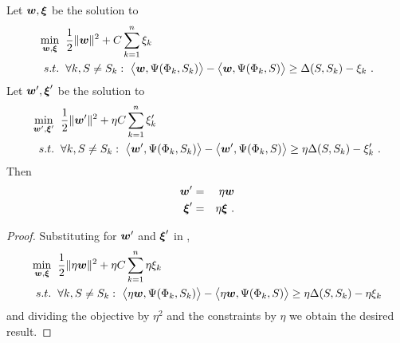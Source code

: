 \begin{proposition}
\label{prop:equivalence}
  Let $\Model,\Slacks$ be the solution to
  \begin{equation}
    \begin{split}
      \min_{\Model,\Slacks} &
      \hspace{2mm} 
      \frac{1}{2} \|\Model\|^2 +
      C \sum_{k=1}^n \Slack_k\\
      s.t. & \hspace{2mm} \forall k, \Seam \neq \Seam_k:~
      \bigl\langle\Model, \JointFtr(\Features_k,\Seam_k)\bigr\rangle -
      \bigl\langle\Model, \JointFtr(\Features_k,\Seam)\bigr\rangle
      \geq
      \Loss(\Seam,\Seam_k) - \Slack_k ~.
    \end{split}
    \label{eq:svm-problem2}
  \end{equation}
  Let $\Model',\Slacks'$ be the solution to
  \begin{equation}
    \begin{split}
      \min_{\Model',\Slacks'} &
      \hspace{2mm} 
      \frac{1}{2} \|\Model'\|^2 +
      \eta C \sum_{k=1}^n \Slack_k'\\
      s.t. & \hspace{2mm} \forall k, \Seam \neq \Seam_k:~
      \bigl\langle\Model', \JointFtr(\Features_k,\Seam_k)\bigr\rangle -
      \bigl\langle\Model', \JointFtr(\Features_k,\Seam)\bigr\rangle
      \geq
      \eta \Loss(\Seam,\Seam_k) - \Slack_k' ~.
    \end{split}
    \label{eq:equiv-problem2}
  \end{equation}
  Then
  \begin{eqnarray}
    \Model' &=& \eta \Model\\
    \Slacks' &=& \eta \Slacks ~.
  \end{eqnarray}
\end{proposition}
\begin{proof}
  Substituting for $\Model'$ and $\Slacks'$ in ,
  \begin{equation}
    \begin{split}
      \min_{\Model,\Slacks} &
      \hspace{2mm} 
      \frac{1}{2} \| \eta \Model \|^2 +
      \eta C \sum_{k=1}^n \eta \Slack_k\\
      s.t. & \hspace{2mm} \forall k, \Seam \neq \Seam_k:~
      \bigl\langle\eta\Model, \JointFtr(\Features_k,\Seam_k)\bigr\rangle -
      \bigl\langle\eta\Model, \JointFtr(\Features_k,\Seam)\bigr\rangle
      \geq
      \eta \Loss(\Seam,\Seam_k) - \eta\Slack_k
    \end{split}
    \label{eq:problem2}
  \end{equation}
  and dividing the objective by $\eta^2$ and the constraints by $\eta$
  we obtain the desired result.
\end{proof}

